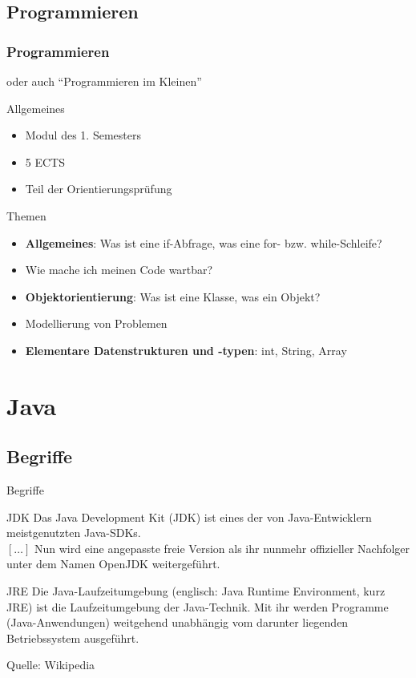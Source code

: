 \documentclass[usepdftitle=false,hyperref={pdfpagelabels=false}]{beamer}
\begin{document}
\subsection{Programmieren}
\begin{frame}
    \frametitle{Programmieren}
    oder auch "`Programmieren im Kleinen"'
    \begin{block}{Allgemeines}
      \begin{itemize}
        \item Modul des 1. Semesters
        \item 5 ECTS
        \item Teil der Orientierungsprüfung
      \end{itemize}
    \end{block}
    \begin{block}{Themen}
      \begin{itemize}
        \item \textbf{Allgemeines}: Was ist eine if-Abfrage, was eine for- bzw. while-Schleife?
        \item Wie mache ich meinen Code wartbar?
        \item \textbf{Objektorientierung}: Was ist eine Klasse, was ein Objekt?
        \item Modellierung von Problemen
        \item \textbf{Elementare Datenstrukturen und -typen}: int, String, Array
      \end{itemize}
    \end{block}
\end{frame}

\section{Java}
\subsection{Begriffe}
\begin{frame}{Begriffe}
    \begin{block}{JDK}
        Das Java Development Kit (JDK) ist eines der von 
        Java-Entwicklern meistgenutzten Java-SDKs.\\
        $[\dots]$ Nun wird eine angepasste freie Version als ihr nunmehr 
        offizieller Nachfolger unter dem Namen OpenJDK weitergeführt.
    \end{block}

    \begin{block}{JRE}
        Die Java-Laufzeitumgebung (englisch: Java Runtime Environment, kurz JRE) 
        ist die Laufzeitumgebung der Java-Technik. Mit ihr werden 
        Programme (Java-Anwendungen) weitgehend unabhängig vom 
        darunter liegenden Betriebssystem ausgeführt.
    \end{block}

    Quelle: Wikipedia
\end{frame}
\end{document}
